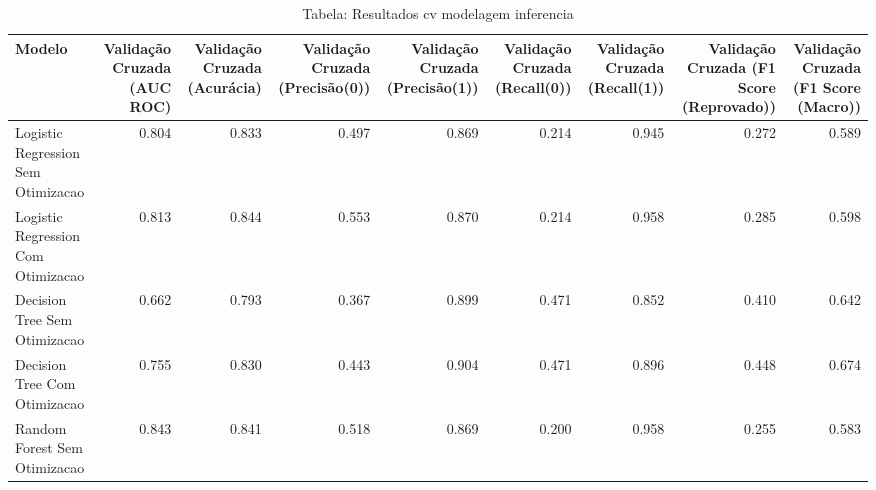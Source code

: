 \begin{table}[H] %
    \centering
    \caption{Tabela: Resultados cv modelagem inferencia}
    \label{tab:resultados_cv_modelagem_inferencia}
    \renewcommand{\arraystretch}{1.25} %
    \begin{adjustwidth}{ -1in }{ -1in } %
    \centering %
    \small %
    \begin{tabular}{lrrrrrrrr}
\toprule
                            Modelo &  Validação Cruzada (AUC ROC) &  Validação Cruzada (Acurácia) &  Validação Cruzada (Precisão(0)) &  Validação Cruzada (Precisão(1)) &  Validação Cruzada (Recall(0)) &  Validação Cruzada (Recall(1)) &  Validação Cruzada (F1 Score (Reprovado)) &  Validação Cruzada (F1 Score (Macro)) \\
\midrule
Logistic Regression Sem Otimizacao &                        0.804 &                         0.833 &                            0.497 &                            0.869 &                          0.214 &                          0.945 &                                     0.272 &                                 0.589 \\
Logistic Regression Com Otimizacao &                        0.813 &                         0.844 &                            0.553 &                            0.870 &                          0.214 &                          0.958 &                                     0.285 &                                 0.598 \\
      Decision Tree Sem Otimizacao &                        0.662 &                         0.793 &                            0.367 &                            0.899 &                          0.471 &                          0.852 &                                     0.410 &                                 0.642 \\
      Decision Tree Com Otimizacao &                        0.755 &                         0.830 &                            0.443 &                            0.904 &                          0.471 &                          0.896 &                                     0.448 &                                 0.674 \\
      Random Forest Sem Otimizacao &                        0.843 &                         0.841 &                            0.518 &                            0.869 &                          0.200 &                          0.958 &                                     0.255 &                                 0.583 \\

\end{tabular}
\end{adjustwidth}
\end{table}
